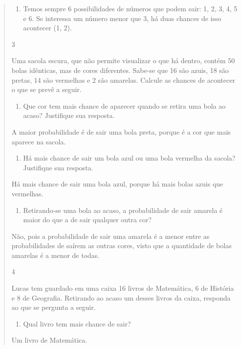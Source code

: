 \begin{mdframed}[linewidth=2pt,linecolor=salmao,roundcorner=2pt]
\begin{itemize}
{\begin{itemize}
\begin{escolha}
{\begin{quote}
{\begin{escolha}
{\begin{enumerate}
\item
  Temos sempre 6 possibilidades de números que podem sair: 1, 2, 3, 4, 5 e 6. Se interessa um número menor que 3, há duas chances de isso acontecer (1, 2).
\end{enumerate}


\num{3}

Uma sacola escura, que não permite visualizar o que há dentro, contém
50 bolas idênticas, mas de cores diferentes. Sabe-se que 16 são azuis,
18 são pretas, 14 são vermelhas e 2 são amarelas. Calcule as chances de
acontecer o que se prevê a seguir.

\begin{enumerate}
\item
  Que cor tem mais chance de aparecer quando se retira uma bola ao acaso? Justifique sua resposta.
\end{enumerate}

A maior probabilidade é de sair uma bola preta, porque é a cor que mais aparece na sacola.

\begin{enumerate}
\item
  Há mais chance de sair um bola azul ou uma bola vermelha da sacola? Justifique sua resposta.
\end{enumerate}

Há mais chance de sair uma bola azul, porque há mais bolas azuis que vermelhas.

\begin{enumerate}
\item
  Retirando-se uma bola ao acaso, a probabilidade de sair amarela é maior do que a de sair qualquer
  outra cor?
\end{enumerate}

Não, pois a probabilidade de sair uma amarela é a menor entre as
  probabilidades de saírem as outras cores, visto que a quantidade de
  bolas amarelas é a menor de todas.


\num{4}

Lucas tem guardado em uma caixa 16 livros de Matemática, 6 de História e
8 de Geografia. Retirando ao acaso um desses livros da caixa, responda ao que se pergunta a seguir.

\begin{enumerate}
\item
  Qual livro tem mais chance de sair?
\end{enumerate}

Um livro de Matemática.

}
\end{escolha}}
\end{quote}}
\end{escolha}
\end{itemize}}
\end{itemize}
\end{mdframed}

